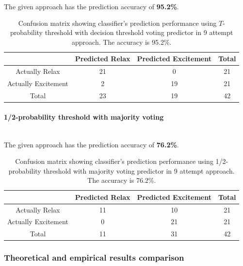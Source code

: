 \documentclass[12pt]{article}
\theoremstyle{definition}
\begin{document}
The given approach has the prediction accuracy of \textbf{95.2\%}.  
\begin{table}[H]
\begin{center}
  \begin{tabular}{ | c | c | c | c | }
    \hline
     & Predicted Relax & Predicted Excitement & Total \\ \hline
    Actually Relax & 21 & 0 & 21 \\ \hline
    Actually Excitement & 2 & 19 & 21 \\ \hline
    Total & 23 & 19 & 42 \\ 
    \hline
  \end{tabular}
\end{center}
\caption{Confusion matrix showing classifier's prediction performance using $T$-probability threshold with decision threshold voting predictor in 9 attempt approach. The accuracy is 95.2\%.} 
\end{table}

\paragraph{1/2-probability threshold with majority voting}~\\

The given approach has the prediction accuracy of \textbf{76.2\%}.  
\begin{table}[H]
\begin{center}
  \begin{tabular}{ | c | c | c | c | }
    \hline
     & Predicted Relax & Predicted Excitement & Total \\ \hline
    Actually Relax & 11 & 10 & 21 \\ \hline
    Actually Excitement & 0 & 21 & 21 \\ \hline
    Total & 11 & 31 & 42 \\ 
    \hline
  \end{tabular}
\end{center}
\caption{Confusion matrix showing classifier's prediction performance using 1/2-probability threshold with majority voting predictor in 9 attempt approach. The accuracy is 76.2\%.} 
\end{table}

\subsubsection{Theoretical and empirical results comparison}
\end{document}
